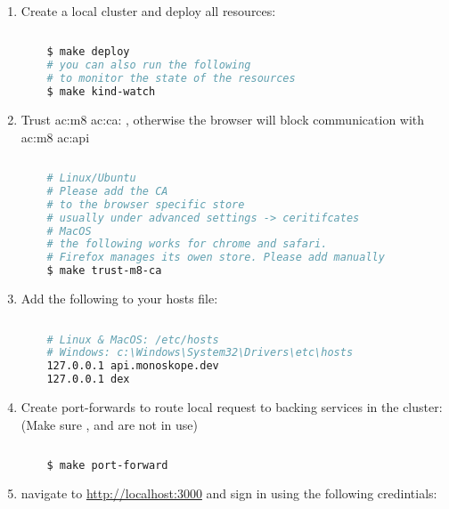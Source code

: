 \begin{enumerate}
  \item Create a local cluster and deploy all resources:

  \begin{lstlisting}[language=bash, caption={Deploy all resources to a local cluster}, label={sh:dartlc}]
    
    $ make deploy
    # you can also run the following 
    # to monitor the state of the resources
    $ make kind-watch
  \end{lstlisting}

  \item Trust \gls{ac:m8} \acrshort{ac:ca}: , otherwise the browser will block communication with \gls{ac:m8} \gls{ac:api}

  \begin{lstlisting}[language=bash, caption={Trust \gls{ac:m8} certificate authority}, label={sh:tmdc}]
    
    # Linux/Ubuntu
    # Please add the CA
    # to the browser specific store
    # usually under advanced settings -> ceritifcates
    # MacOS
    # the following works for chrome and safari. 
    # Firefox manages its owen store. Please add manually
    $ make trust-m8-ca
  \end{lstlisting}

  \item Add the following to your hosts file:

  \begin{lstlisting}[language=bash, caption={Update hosts file}, label={sh:uhf}]
    
    # Linux & MacOS: /etc/hosts
    # Windows: c:\Windows\System32\Drivers\etc\hosts
    127.0.0.1 api.monoskope.dev
    127.0.0.1 dex
  \end{lstlisting}

  \pagebreak

  \item Create port-forwards to route local request to backing services in the cluster: (Make sure ,  and  are not in use)

  \begin{lstlisting}[language=bash, caption={Create port-forwards to route local request}, label={sh:cpf}]
    
    $ make port-forward
  \end{lstlisting}

  \item navigate to \href{http://localhost:3000}{http://localhost:3000} and sign in using the following credintials:
  

\end{enumerate}
